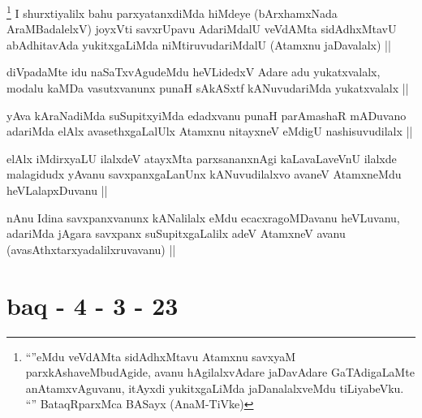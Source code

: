 \begin{artha}
\footnote{``\stext''eMdu veVdAMta sidAdhxMtavu Atamxnu savxyaM parxkAshaveMbudAgide, avanu hAgilalxvAdare jaDavAdare GaTAdigaLaMte anAtamxvAguvanu, itAyxdi yukitxgaLiMda jaDanalalxveMdu tiLiyabeVku. ``\stext'' BataqRparxMca BASayx (AnaM-TiVke)}
I shurxtiyalilx bahu parxyatanxdiMda hiMdeye (bArxhamxNada AraMBadalelxV) joyxVti savxrUpavu AdariMdalU veVdAMta sidAdhxMtavU abAdhitavAda yukitxgaLiMda niMtiruvudariMdalU (Atamxnu jaDavalalx) ||
\end{artha}


\begin{artha}
diVpadaMte idu naSaTxvAgudeMdu heVLidedxV Adare adu yukatxvalalx, modalu kaMDa vasutxvanunx punaH sAkASxtf kANuvudariMda yukatxvalalx ||
\end{artha}


\begin{artha}
yAva kAraNadiMda suSupitxyiMda edadxvanu punaH parAmashaR mADuvano adariMda elAlx avasethxgaLalUlx Atamxnu nitayxneV eMdigU nashisuvudilalx ||
\end{artha}


\begin{artha}
elAlx iMdirxyaLU ilalxdeV atayxMta parxsananxnAgi kaLavaLaveVnU ilalxde malagidudx yAvanu savxpanxgaLanUnx kANuvudilalxvo avaneV AtamxneMdu heVLalapxDuvanu ||
\end{artha}


\begin{artha}
nAnu Idina savxpanxvanunx kANalilalx eMdu ecacxragoMDavanu heVLuvanu, adariMda jAgara savxpanx suSupitxgaLalilx adeV AtamxneV avanu (avasAthxtarxyadalilxruvavanu) ||
\end{artha}

\section*{baq - 4 - 3 - 23}

\stext



